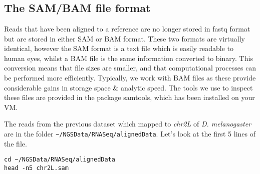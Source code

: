 
\chapter{\moduleTitle}
\newpage

\section{The SAM/BAM file format}
\begin{information}
Reads that have been aligned to a reference are no longer stored in fastq format but are stored in either SAM or BAM format.
These two formats are virtually identical, however the SAM format is a text file which is easily readable to human eyes, whilst a BAM file is the same information converted to binary.
This conversion means that file sizes are smaller, and that computational processes can be performed more efficiently.
Typically, we work with BAM files as these provide considerable gains in storage space \& analytic speed.
The tools we use to inspect these files are provided in the package samtools, which has been installed on your VM. \\
\end{information}

\begin{steps}
The reads from the previous dataset which mapped to \textit{chr2L} of \textit{D. melanogaster} are in the folder \texttt{\~{}/NGSData/RNASeq/alignedData}.
Let's look at the first 5 lines of the file.
\begin{lstlisting}
cd ~/NGSData/RNASeq/alignedData
head -n5 chr2L.sam  
\end{lstlisting}
\end{steps}

